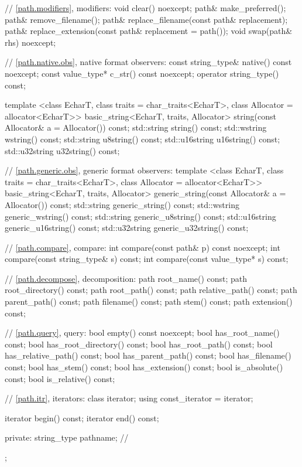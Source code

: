 \begin{codeblock}
{{    // \ref{path.modifiers}, modifiers:
    void  clear() noexcept;
    path& make_preferred();
    path& remove_filename();
    path& replace_filename(const path& replacement);
    path& replace_extension(const path& replacement = path());
    void  swap(path& rhs) noexcept;

    // \ref{path.native.obs}, native format observers:
    const string_type& native() const noexcept;
    const value_type*  c_str() const noexcept;
    operator string_type() const;

    template <class EcharT, class traits = char_traits<EcharT>,
              class Allocator = allocator<EcharT>>
      basic_string<EcharT, traits, Allocator>
        string(const Allocator& a = Allocator()) const;
    std::string    string() const;
    std::wstring   wstring() const;
    std::string    u8string() const;
    std::u16string u16string() const;
    std::u32string u32string() const;

    // \ref{path.generic.obs}, generic format observers:
    template <class EcharT, class traits = char_traits<EcharT>,
              class Allocator = allocator<EcharT>>
      basic_string<EcharT, traits, Allocator>
        generic_string(const Allocator& a = Allocator()) const;
    std::string    generic_string() const;
    std::wstring   generic_wstring() const;
    std::string    generic_u8string() const;
    std::u16string generic_u16string() const;
    std::u32string generic_u32string() const;

    // \ref{path.compare}, compare:
    int  compare(const path& p) const noexcept;
    int  compare(const string_type& s) const;
    int  compare(const value_type* s) const;

    // \ref{path.decompose}, decomposition:
    path root_name() const;
    path root_directory() const;
    path root_path() const;
    path relative_path() const;
    path parent_path() const;
    path filename() const;
    path stem() const;
    path extension() const;

    // \ref{path.query}, query:
    bool empty() const noexcept;
    bool has_root_name() const;
    bool has_root_directory() const;
    bool has_root_path() const;
    bool has_relative_path() const;
    bool has_parent_path() const;
    bool has_filename() const;
    bool has_stem() const;
    bool has_extension() const;
    bool is_absolute() const;
    bool is_relative() const;

    // \ref{path.itr}, iterators:
    class iterator;
    using const_iterator = iterator;

    iterator begin() const;
    iterator end() const;

  private:
    string_type pathname; // \expos
  };
}
\end{codeblock}

